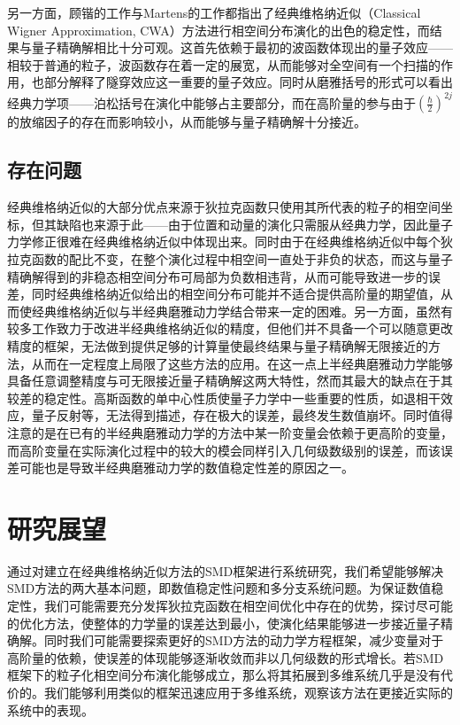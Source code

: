 另一方面，顾锴的工作与Martens的工作都指出了经典维格纳近似（Classical Wigner Approximation, CWA）方法进行相空间分布演化的出色的稳定性，而结果与量子精确解相比十分可观\cite{kaiguPSQHD,donoso2000simulation}。这首先依赖于最初的波函数体现出的量子效应——相较于普通的粒子，波函数存在着一定的展宽，从而能够对全空间有一个扫描的作用，也部分解释了隧穿效应这一重要的量子效应。同时从磨雅括号的形式可以看出经典力学项——泊松括号在演化中能够占主要部分，而在高阶量的参与由于$\left(\frac{\hbar}{2}\right)^{2j}$的放缩因子的存在而影响较小，从而能够与量子精确解十分接近。
\subsection{存在问题}
经典维格纳近似的大部分优点来源于狄拉克函数只使用其所代表的粒子的相空间坐标，但其缺陷也来源于此——由于位置和动量的演化只需服从经典力学，因此量子力学修正很难在经典维格纳近似中体现出来。同时由于在经典维格纳近似中每个狄拉克函数的配比不变，在整个演化过程中相空间一直处于非负的状态，而这与量子精确解得到的非稳态相空间分布可局部为负数相违背\cite{heller1976wigner}，从而可能导致进一步的误差，同时经典维格纳近似给出的相空间分布可能并不适合提供高阶量的期望值，从而使经典维格纳近似与半经典磨雅动力学结合带来一定的困难。另一方面，虽然有较多工作致力于改进半经典维格纳近似的精度\cite{heller1976wigner,liu2007real}，但他们并不具备一个可以随意更改精度的框架，无法做到提供足够的计算量使最终结果与量子精确解无限接近的方法，从而在一定程度上局限了这些方法的应用。在这一点上半经典磨雅动力学能够具备任意调整精度与可无限接近量子精确解这两大特性，然而其最大的缺点在于其较差的稳定性\cite{YifanShenPSQHD,kaiguPSQHD}。高斯函数的单中心性质使量子力学中一些重要的性质，如退相干效应，量子反射等，无法得到描述，存在极大的误差，最终发生数值崩坏。同时值得注意的是在已有的半经典磨雅动力学的方法中某一阶变量会依赖于更高阶的变量，而高阶变量在实际演化过程中的较大的模会同样引入几何级数级别的误差，而该误差可能也是导致半经典磨雅动力学的数值稳定性差的原因之一。

\section{研究展望}
通过对建立在经典维格纳近似方法的SMD框架进行系统研究，我们希望能够解决SMD方法的两大基本问题，即数值稳定性问题和多分支系统问题。为保证数值稳定性，我们可能需要充分发挥狄拉克函数在相空间优化中存在的优势，探讨尽可能的优化方法，使整体的力学量的误差达到最小，使演化结果能够进一步接近量子精确解。同时我们可能需要探索更好的SMD方法的动力学方程框架，减少变量对于高阶量的依赖，使误差的体现能够逐渐收敛而非以几何级数的形式增长。若SMD框架下的粒子化相空间分布演化能够成立，那么将其拓展到多维系统几乎是没有代价的。我们能够利用类似的框架迅速应用于多维系统，观察该方法在更接近实际的系统中的表现。
\newpage
{ \songti \printbibliography[title={参考文献}]}

